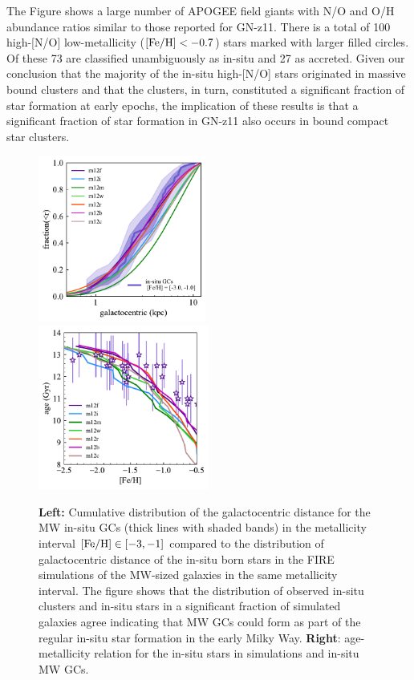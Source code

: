 \documentclass[a4paper,useAMS,usenatbib]{mnras}
\begin{document}
The Figure shows a large number of APOGEE field giants with N/O and O/H abundance ratios similar to those reported for GN-z11. There is a total of 100 high-[N/O] low-metallicity ($\rm [Fe/H]<-0.7$) stars marked with larger filled circles. Of these 73 are classified unambiguously as in-situ and 27 as accreted. 
Given our conclusion that the majority of the in-situ high-[N/O] stars originated in massive bound clusters and that the clusters, in turn, constituted a significant fraction of star formation at early epochs, the implication of these
results is that a significant fraction of star formation in GN-z11 also occurs in bound compact star clusters. 

%
\begin{figure}
  \centering
  \includegraphics[width=0.49\textwidth]{img/dgc_insitu_dist_feh-3.0-1.0.pdf}
  \includegraphics[width=0.501\textwidth]{img/age_feh_gc_sim.pdf}
  \caption[]{{\bf Left:}\/ Cumulative distribution of the galactocentric distance for the MW in-situ GCs (thick lines with shaded bands) in the metallicity interval $\rm [Fe/H]\in [-3,-1]$ 
  compared to the distribution of galactocentric distance of the in-situ born stars in the FIRE simulations of the MW-sized galaxies in the same metallicity interval. The figure shows that the distribution of observed in-situ clusters and in-situ stars in a significant fraction of simulated galaxies agree indicating that MW GCs could form as part of the regular in-situ star formation in the early Milky Way. {\bf Right}: age-metallicity relation for the in-situ stars in simulations and in-situ MW GCs.} 
   \label{fig:dgc_insitu_dist}
\end{figure}
%
\end{document}
